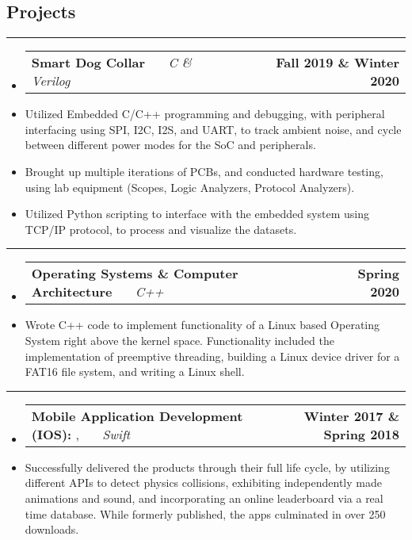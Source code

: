 \documentclass[10pt,letterpaper]{article}
\makeatletter
\newcommand{\header}[2]
{
	\begin{tabular*}{\linewidth}{l @{\extracolsep{\fill}} r}
		\hspace{-27pt} #1 & #2 \\
	\end{tabular*}
}
\newcommand{\sectionbreak}
{
	\vspace{-1.2em}
	\rule{\textwidth}{1.7pt}
	\vspace{-1.7em}
}
\makeatother
\begin{document}
\subsection*{Projects}
\sectionbreak


\begin{itemize}
	\item[]
		\header
		{
			\textbf{Smart Dog Collar}
			\emph{\smash{Senior Design Project}} \ \ \ \footnotesize \emph{C \& Verilog}
		}
			{\textbf{Fall 2019 \& Winter 2020}}
		\item 
			Utilized Embedded C/C++ programming and debugging, with peripheral interfacing using SPI, I2C, I2S, and UART, to track ambient noise, and cycle between different power modes for the SoC and peripherals.
		\item 
			Brought up multiple iterations of PCBs, and conducted hardware testing, using lab equipment (Scopes, Logic Analyzers, Protocol Analyzers).

		\item 
			Utilized Python scripting to interface with the embedded system using TCP/IP protocol, to process and visualize the datasets.

\end{itemize}

\hrule

\begin{itemize}
	\item[]
		\header
		{
			\textbf{Operating Systems \& Computer Architecture}
			\emph{\smash{Relevant Course Projects}} \ \ \ \footnotesize \emph{C++}
		}
			{\textbf{Spring 2020}}
		\item 
			Wrote C++ code to implement functionality of a Linux based Operating System right above the kernel space. Functionality included the implementation of preemptive threading, building a Linux device driver for a FAT16 file system, and writing a Linux shell.

\end{itemize}
\hrule
\begin{itemize}
	\item[]
		\header
		{
			\textbf{Mobile Application Development (IOS): }
			\href{https://appadvice.com/app/round-bound/1369632746}{\emph{\underline{\smash{Round 'a Bound}}}}, 
			\href{https://appadvice.com/app/tic-tac-emoji/1346934986}{\emph{\underline{\smash{Tic-Tac Emoji}}}} \ \ \ \footnotesize  \emph{Swift}
		}
			{\textbf{Winter 2017 \& Spring 2018}}
		\item 
			Successfully delivered the products through their full life cycle, by utilizing different APIs to detect physics collisions, exhibiting independently made animations and sound, and incorporating an online leaderboard via a real time database. While formerly published, the apps culminated in over 250 downloads.
\end{itemize}
\end{document}
